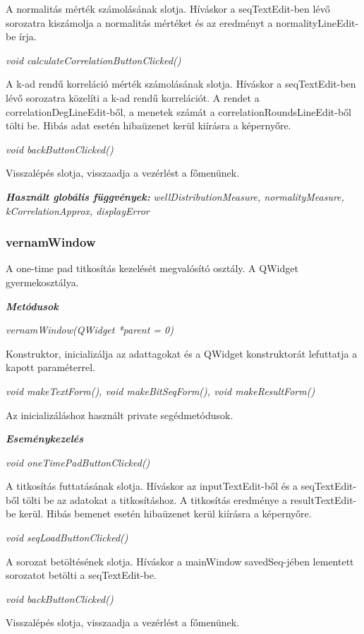 \documentclass[12pt]{article}
\begin{document}
A normalitás mérték számolásának slotja. Híváskor a seqTextEdit-ben lévő sorozatra kiszámolja a normalitás mértéket és az eredményt a normalityLineEdit-be írja.

\textit{void calculateCorrelationButtonClicked()}

A k-ad rendű korreláció mérték számolásának slotja. Híváskor a seqTextEdit-ben lévő sorozatra közelíti a k-ad rendű korrelációt. A rendet a correlationDegLineEdit-ből, a menetek számát a correlationRoundsLineEdit-ből tölti be. Hibás adat esetén hibaüzenet kerül kiírásra a képernyőre.

\textit{void backButtonClicked()}

Visszalépés slotja, visszaadja a vezérlést a főmenünek.

\textit{\textbf{Használt globális függvények: }}\textit{wellDistributionMeasure, normalityMeasure, kCorrelationApprox, displayError}

\subsubsection*{vernamWindow}

A one-time pad titkosítás kezelését megvalósító osztály. A QWidget gyermekosztálya.

\textbf{\textit{Metódusok}}

\textit{vernamWindow(QWidget *parent = 0)}

Konstruktor, inicializálja az adattagokat és a QWidget konstruktorát lefuttatja a kapott paraméterrel.

\textit{void makeTextForm(), void makeBitSeqForm(),	void makeResultForm()}

Az inicializáláshoz használt private segédmetódusok.

\textbf{\textit{Eseménykezelés}}

\textit{void oneTimePadButtonClicked()}

A titkosítás futtatásának slotja. Híváskor az inputTextEdit-ből és a  seqTextEdit-ből tölti be az adatokat a titkosításhoz. A titkosítás eredménye a resultTextEdit-be kerül. Hibás bemenet esetén hibaüzenet kerül kiírásra a képernyőre.

\textit{void seqLoadButtonClicked()}

A sorozat betöltésének slotja. Híváskor a mainWindow savedSeq-jében lementett sorozatot betölti a seqTextEdit-be.

\textit{void backButtonClicked()}

Visszalépés slotja, visszaadja a vezérlést a főmenünek.
\end{document}
